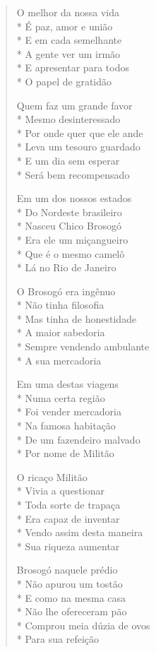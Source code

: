 \begin{verse}
O melhor da nossa vida\\*
É paz, amor e união\\*
E em cada semelhante\\*
A gente ver um irmão\\*
E apresentar para todos\\*
O papel de gratidão

Quem faz um grande favor\\*
Mesmo desinteressado\\*
Por onde quer que ele ande\\*
Leva um tesouro guardado\\*
E um dia sem esperar \\*
Será bem recompensado

Em um dos nossos estados\\*
Do Nordeste brasileiro\\*
Nasceu Chico Brosogó\\*
Era ele um miçangueiro\\*
Que é o mesmo camelô\\*
Lá no Rio de Janeiro

O Brosogó era ingênuo\\*
Não tinha filosofia\\*
Mas tinha de honestidade\\*
A maior sabedoria\\*
Sempre vendendo ambulante\\*
A sua mercadoria

Em uma destas viagens\\*
Numa certa região\\*
Foi vender mercadoria\\*
Na famosa habitação\\*
De um fazendeiro malvado\\*
Por nome de Militão

O ricaço Militão\\*
Vivia a questionar\\*
Toda sorte de trapaça\\*
Era capaz de inventar\\*
Vendo assim desta maneira\\*
Sua riqueza aumentar

Brosogó naquele prédio\\*
Não apurou um tostão\\*
E como na mesma casa\\*
Não lhe ofereceram pão\\*
Comprou meia dúzia de ovos\\*
Para sua refeição


\end{verse}
